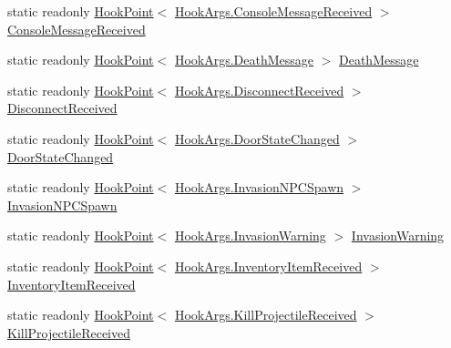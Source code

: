 \begin{DoxyCompactItemize}
\item 
static readonly \hyperlink{classOTA_1_1Plugin_1_1HookPoint}{Hook\+Point}$<$ \hyperlink{structOTA_1_1Plugin_1_1HookArgs_1_1ConsoleMessageReceived}{Hook\+Args.\+Console\+Message\+Received} $>$ \hyperlink{classOTA_1_1Plugin_1_1HookPoints_aed7000f14ab7fbd020b86838e329c0a2}{Console\+Message\+Received}
\item 
static readonly \hyperlink{classOTA_1_1Plugin_1_1HookPoint}{Hook\+Point}$<$ \hyperlink{structOTA_1_1Plugin_1_1HookArgs_1_1DeathMessage}{Hook\+Args.\+Death\+Message} $>$ \hyperlink{classOTA_1_1Plugin_1_1HookPoints_a970bc4a6a6472f8c399c072d257cb418}{Death\+Message}
\item 
static readonly \hyperlink{classOTA_1_1Plugin_1_1HookPoint}{Hook\+Point}$<$ \hyperlink{structOTA_1_1Plugin_1_1HookArgs_1_1DisconnectReceived}{Hook\+Args.\+Disconnect\+Received} $>$ \hyperlink{classOTA_1_1Plugin_1_1HookPoints_a92254999379abe19b2e6b965442a46b3}{Disconnect\+Received}
\item 
static readonly \hyperlink{classOTA_1_1Plugin_1_1HookPoint}{Hook\+Point}$<$ \hyperlink{structOTA_1_1Plugin_1_1HookArgs_1_1DoorStateChanged}{Hook\+Args.\+Door\+State\+Changed} $>$ \hyperlink{classOTA_1_1Plugin_1_1HookPoints_ab3fa8eebd2e74a672b56eb075f2ab11a}{Door\+State\+Changed}
\item 
static readonly \hyperlink{classOTA_1_1Plugin_1_1HookPoint}{Hook\+Point}$<$ \hyperlink{structOTA_1_1Plugin_1_1HookArgs_1_1InvasionNPCSpawn}{Hook\+Args.\+Invasion\+N\+P\+C\+Spawn} $>$ \hyperlink{classOTA_1_1Plugin_1_1HookPoints_a2f530ac3e05bab894bd225c1fdbed532}{Invasion\+N\+P\+C\+Spawn}
\item 
static readonly \hyperlink{classOTA_1_1Plugin_1_1HookPoint}{Hook\+Point}$<$ \hyperlink{structOTA_1_1Plugin_1_1HookArgs_1_1InvasionWarning}{Hook\+Args.\+Invasion\+Warning} $>$ \hyperlink{classOTA_1_1Plugin_1_1HookPoints_adcffee4c69ca7fde3e02c71cbf613003}{Invasion\+Warning}
\item 
static readonly \hyperlink{classOTA_1_1Plugin_1_1HookPoint}{Hook\+Point}$<$ \hyperlink{structOTA_1_1Plugin_1_1HookArgs_1_1InventoryItemReceived}{Hook\+Args.\+Inventory\+Item\+Received} $>$ \hyperlink{classOTA_1_1Plugin_1_1HookPoints_afc86185bc0b41a8c8deec7cacc56689f}{Inventory\+Item\+Received}
\item 
static readonly \hyperlink{classOTA_1_1Plugin_1_1HookPoint}{Hook\+Point}$<$ \hyperlink{structOTA_1_1Plugin_1_1HookArgs_1_1KillProjectileReceived}{Hook\+Args.\+Kill\+Projectile\+Received} $>$ \hyperlink{classOTA_1_1Plugin_1_1HookPoints_a4c6ebb602434a446d8455c669654868b}{Kill\+Projectile\+Received}

\end{DoxyCompactItemize}
